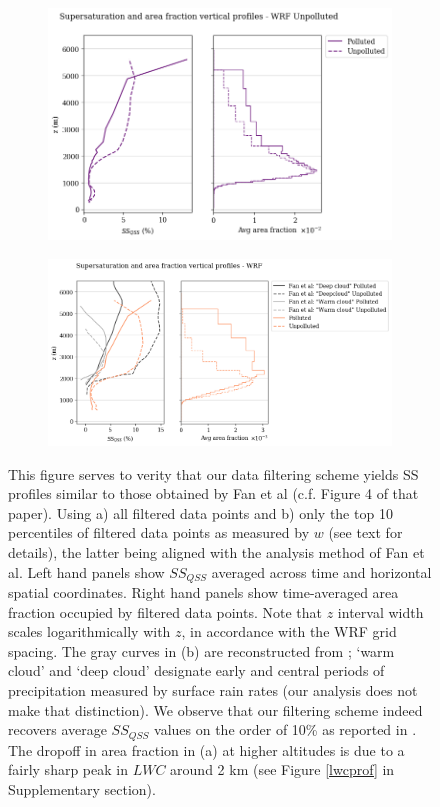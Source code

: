 \documentclass{article}
\begin{document}
\begin{figure}[ht]
	\centering
	\begin{subfigure}{0.7\textwidth}
		\includegraphics[width=\textwidth]{revmywrf/v21_FINAL_bipanel_ss_qss_vs_z_allpts_figure.png}
		\caption{}
		\label{wrfbipanelallpts}
	\end{subfigure}
	\begin{subfigure}{0.7\textwidth}
		\includegraphics[width=\textwidth]{revmywrf/v21_FINAL_bipanel_ss_qss_vs_z_up10perc_figure.png}
		\caption{}
		\label{wrfbipanelup50perc}
	\end{subfigure}
	\caption{This figure serves to verity that our data filtering scheme yields SS profiles similar to those obtained by Fan et al (c.f. Figure 4 of that paper). Using a) all filtered data points and b) only the top 10 percentiles of filtered data points as measured by $w$ (see text for details), the latter being aligned with the analysis method of Fan et al. Left hand panels show $SS_{QSS}$ averaged across time and horizontal spatial coordinates. Right hand panels show time-averaged area fraction occupied by filtered data points. Note that $z$ interval width scales logarithmically with $z$, in accordance with the WRF grid spacing. The gray curves in (b) are reconstructed from \cite{Fan2018}; `warm cloud' and `deep cloud' designate early and central periods of precipitation measured by surface rain rates (our analysis does not make that distinction). We observe that our filtering scheme indeed recovers average $SS_{QSS}$ values on the order of 10\% as reported in \cite{Fan2018}. The dropoff in area fraction in (a) at higher altitudes is due to a fairly sharp peak in $LWC$ around 2 km (see Figure \ref{lwcprof} in Supplementary section).}

\end{figure}
\end{document}
